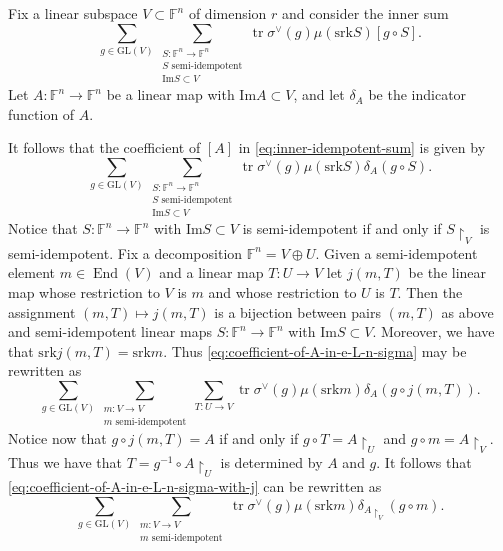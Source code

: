 \documentclass[12pt, reqno]{amsart}
\theoremstyle{definition}
\newcommand{\ImageOf}{\mathrm{Im}}
\newcommand{\EndomorphismRing}{\operatorname{End}}
\newcommand{\trace}{\operatorname{tr}}
\newcommand{\GL}{\mathrm{GL}}
\newcommand{\finiteField}{\mathbb{F}}
\newcommand{\srank}{\mathrm{srk}}
\begin{document}
	Fix a linear subspace $V \subset \finiteField^n$ of dimension $r$ and consider the inner sum
	\begin{equation}\label{eq:inner-idempotent-sum}
		\sum_{g \in \GL\left(V\right)} \sum_{\substack{S \colon \finiteField^n \to \finiteField^n\\
				S \text{ semi-idempotent}\\
				\ImageOf S \subset V}} \trace \sigma^{\vee}\left(g\right) \mu\left(\srank S\right) \left[g \circ S\right].
	\end{equation}
	Let $A \colon \finiteField^n \to \finiteField^n$ be a linear map with $\ImageOf A \subset V$, and let $\delta_A$ be the indicator function of $A$.
	
	It follows that the coefficient of $\left[A\right]$ in \eqref{eq:inner-idempotent-sum} is given by
	\begin{equation}\label{eq:coefficient-of-A-in-e-L-n-sigma}
		\sum_{g \in \GL\left(V\right)} \sum_{\substack{S \colon \finiteField^n \to \finiteField^n\\
				S \text{ semi-idempotent}\\
			\ImageOf S \subset V}} \trace \sigma^{\vee}\left(g\right) \mu\left(\srank S\right) \delta_A\left(g \circ S\right).
	\end{equation}
	Notice that $S \colon \finiteField^n \to \finiteField^n$ with $\ImageOf S \subset V$ is semi-idempotent if and only if $S \restriction_V$ is semi-idempotent. Fix a decomposition $\finiteField^n = V \oplus U$. Given a semi-idempotent element $m \in \EndomorphismRing\left(V\right)$ and a linear map $T \colon U \to V$ let $j\left(m, T\right)$ be the linear map whose restriction to $V$ is $m$ and whose restriction to $U$ is $T$. Then the assignment $\left(m,T\right) \mapsto j\left(m, T\right)$ is a bijection between pairs $\left(m, T\right)$ as above and semi-idempotent linear maps $S \colon \finiteField^n \to \finiteField^n$ with $\ImageOf S \subset V$. Moreover, we have that $\srank j\left(m,T\right) = \srank m$. Thus \eqref{eq:coefficient-of-A-in-e-L-n-sigma} may be rewritten as
	\begin{equation}\label{eq:coefficient-of-A-in-e-L-n-sigma-with-j}
	\sum_{g \in \GL\left(V\right)} \sum_{\substack{m \colon V \to V\\
			m \text{ semi-idempotent}}} \sum_{T \colon U \to V} \trace \sigma^{\vee}\left(g\right) \mu\left(\srank m\right) \delta_A\left(g \circ j\left(m,T\right)\right).
	\end{equation}	
	Notice now that $g \circ j\left(m,T\right) = A$ if and only if $g \circ T = A \restriction_{U}$ and $g \circ m = A \restriction_{V}$. Thus we have that $T = g^{-1} \circ A\restriction_{U}$ is  determined by $A$ and $g$. It follows that \eqref{eq:coefficient-of-A-in-e-L-n-sigma-with-j} can be rewritten as
	\begin{equation}\label{eq:coefficient-of-A-in-e-L-n-sigma-with-j-over-V}
	\sum_{g \in \GL\left(V\right)} \sum_{\substack{m \colon V \to V\\
			m \text{ semi-idempotent}}} \trace \sigma^{\vee}\left(g\right) \mu\left(\srank m\right) \delta_{A \restriction_V}\left(g \circ m\right).
	\end{equation}		
	
\end{document}
